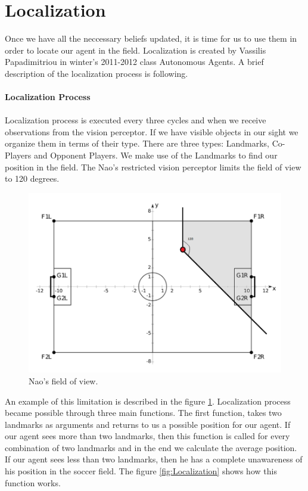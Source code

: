 \section{Localization}
Once we have all the neccessary beliefs updated, it is time for us to use them in order to locate our agent in the field. Localization is created by Vassilis Papadimitriou in winter's 2011-2012 class Autonomous Agents. A brief description of the localization process is following.\\
\\
{\bf Localization Process}\\
\\
Localization process is executed every three cycles and when we receive observations from the vision perceptor. If we have visible objects in our sight we organize them in terms of their type. There are three types: Landmarks, Co-Players and Opponent Players. We make use of the Landmarks to find our position in the field.
The Nao's restricted vision perceptor limits the field of view to 120 degrees.
\begin{figure}[!ht]
\centering
  \includegraphics[scale=0.3]{Chapter3/figures/Localization1.png}
  \caption{Nao's field of view.} 
  \label{fig:fieldofview}
\end{figure}
An example of this limitation is described in the figure \ref{fig:fieldofview}.
Localization process became possible through three main functions. The first function, takes two landmarks as arguments and returns to us a possible position for our agent. If our agent sees more than two landmarks, then this function is called for every combination of two landmarks and in the end we calculate the average position. If our agent sees less than two landmarks, then he has a complete unawareness of his position in the soccer field. The figure \ref{fig:Localization} shows how this function works.
